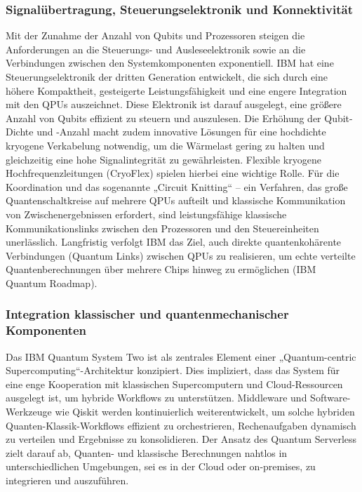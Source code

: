 


\subsubsection{Signalübertragung, Steuerungselektronik und Konnektivität}
Mit der Zunahme der Anzahl von Qubits und Prozessoren steigen die Anforderungen an die Steuerungs- und Ausleseelektronik sowie an die Verbindungen zwischen den Systemkomponenten exponentiell. %
IBM hat eine Steuerungselektronik der dritten Generation entwickelt, die sich durch eine höhere Kompaktheit, gesteigerte Leistungsfähigkeit und eine engere Integration mit den QPUs auszeichnet. Diese Elektronik ist darauf ausgelegt, eine größere Anzahl von Qubits effizient zu steuern und auszulesen. %
Die Erhöhung der Qubit-Dichte und -Anzahl macht zudem innovative Lösungen für eine hochdichte kryogene Verkabelung notwendig, um die Wärmelast gering zu halten und gleichzeitig eine hohe Signalintegrität zu gewährleisten. Flexible kryogene Hochfrequenzleitungen (CryoFlex) spielen hierbei eine wichtige Rolle. Für die Koordination und das sogenannte „Circuit Knitting“ – ein Verfahren, das große Quantenschaltkreise auf mehrere QPUs aufteilt und klassische Kommunikation von Zwischenergebnissen erfordert, sind leistungsfähige klassische Kommunikationslinks zwischen den Prozessoren und den Steuereinheiten unerlässlich. %
Langfristig verfolgt IBM das Ziel, auch direkte quantenkohärente Verbindungen (Quantum Links) zwischen QPUs zu realisieren, um echte verteilte Quantenberechnungen über mehrere Chips hinweg zu ermöglichen (IBM Quantum Roadmap).

\subsubsection{Integration klassischer und quantenmechanischer Komponenten}
Das IBM Quantum System Two ist als zentrales Element einer „Quantum-centric Supercomputing“-Architektur konzipiert. Dies impliziert, dass das System für eine enge Kooperation mit klassischen Supercomputern und Cloud-Ressourcen ausgelegt ist, um hybride Workflows zu unterstützen. Middleware und Software-Werkzeuge wie Qiskit werden kontinuierlich weiterentwickelt, um solche hybriden Quanten-Klassik-Workflows effizient zu orchestrieren, Rechenaufgaben dynamisch zu verteilen und Ergebnisse zu konsolidieren. %
Der Ansatz des Quantum Serverless zielt darauf ab, Quanten- und klassische Berechnungen nahtlos in unterschiedlichen Umgebungen, sei es in der Cloud oder on-premises, zu integrieren und auszuführen.

